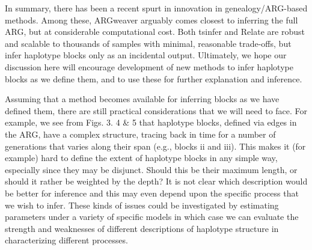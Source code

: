 \documentclass[twocolumn]{bmcart}%
\begin{document}
In summary, there has been a recent spurt in innovation in genealogy/ARG-based methods. Among these, ARGweaver arguably comes closest to inferring the full ARG, but at considerable computational cost. Both tsinfer and Relate are robust and scalable to thousands of samples with minimal, reasonable trade-offs, but infer haplotype blocks only as an incidental output. Ultimately, we hope our discussion here will encourage development of new methods to infer haplotype blocks as we define them, and to use these for further explanation and inference. 

Assuming that a method becomes available for inferring blocks as we have defined them, there are still practical considerations that we will need to face. For example, we see from Figs. 3. 4 \& 5 that haplotype blocks, defined via edges in the ARG, have a complex structure, tracing back in time for a number of generations that varies along their span (e.g., blocks ii and iii). This makes it (for example) hard to define the extent of haplotype blocks in any simple way, especially since they may be disjunct. Should this be their maximum length, or should it rather be weighted by the depth? It is not clear which description would be better for inference and this may even depend upon the specific process that we wish to infer. These kinds of issues could be investigated by estimating parameters under a variety of specific models in which case we can evaluate the strength and weaknesses of different descriptions of haplotype structure in characterizing different processes.
\end{document}

